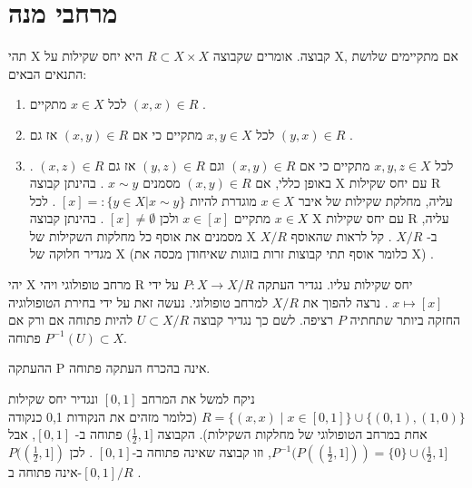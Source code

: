 \documentclass{tstextbook}
\begin{document}
\section{מרחבי מנה}

\begin{reminder}
תהי X קבוצה. אומרים שקבוצה \(R\subset X\times X\) היא יחס שקילות על X, אם מתקיימים שלושת התנאים הבאים:

  \begin{enumerate}
    \item לכל \(x\in X\) מתקיים \((x,x)\in R\) . 


    \item לכל \(x,y\in X\) מתקיים כי אם \((x,y)\in R\) אז גם \((y,x)\in R\) . 


    \item לכל \(x,y,z\in X\) מתקיים כי אם \((x,y)\in R\) וגם \((y,z)\in R\) אז גם \((x,z)\in R\) . 
באופן כללי, אם \((x,y)\in R\) מסמנים \(x\sim y\) .
בהינתן קבוצה X עם יחס שקילות R עליה, מחלקת שקילות של איבר \(x\in X\) מוגדרת להיות \([x]=:\{y\in X|x\sim y\}\) .
לכל \(x\in X\) מתקיים \(x\in[x]\) ולכן \([x]\ne\emptyset\) .
בהינתן קבוצה X עם יחס שקילות R עליה, מסמנים את אוסף כל מחלקות השקילות של X ב- \(X/R\) . קל לראות שהאוסף \(X/R\) מגדיר חלוקה של X (כלומר אוסף תתי קבוצות זרות בזוגות שאיחודן מכסה את X) .


  \end{enumerate}
\end{reminder}
\begin{definition}
יהי X מרחב טופולוגי ויהי R יחס שקילות עליו.
נגדיר העתקה \(P:X\rightarrow X/R\) על ידי \(x\mapsto[x]\) .
נרצה להפוך את \(X/R\) למרחב טופולוגי. נעשה זאת על ידי בחירת הטופולוגיה החזקה ביותר שתחתיה \(P\) רציפה.
לשם כך נגדיר קבוצה \(U\subset X/R\) להיות פתוחה אם ורק אם \(P^{-1}(U)\subset X\) פתוחה.

\end{definition}
\begin{remark}
ההעתקה P אינה בהכרח העתקה פתוחה.

\end{remark}
\begin{example}
ניקח למשל את המרחב \([0,1]\) ונגדיר יחס שקילות \(R=\{(x,x) \mid x\in[0,1]\}\cup\{(0,1),(1,0)\}\) (כלומר מזהים את הנקודות 0,1 כנקודה אחת במרחב הטופולוגי של מחלקות השקילות).
הקבוצה \((\frac{1}{2},1]\) פתוחה ב- \([0,1]\), אבל \(P^{-1}(P((\frac{1}{2},1]))=\{0\}\cup(\frac{1}{2},1]\), וזו קבוצה שאינה פתוחה ב-\([0,1]\) . לכן \(P((\frac{1}{2},1])\) אינה פתוחה ב-\([0,1]/R\) .

\end{example}
\end{document}
